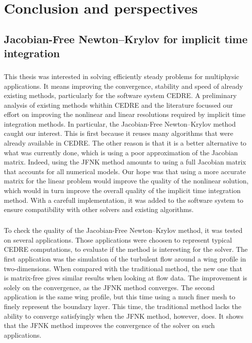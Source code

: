 \chapter*{Conclusion and perspectives}

  \section*{Jacobian-Free Newton--Krylov for implicit time integration}

    \paragraph{}
    This thesis was interested in solving efficiently steady problems for multiphysic applications.
    It means improving the convergence, stability and speed of already existing methods, particularly for the software system CEDRE.
    A preliminary analysis of existing methods whithin CEDRE and the literature focussed our effort on improving the nonlinear and linear resolutions required by implicit time integration methods.
    In particular, the Jacobian-Free Newton--Krylov method caught our interest.
    This is first because it reuses many algorithms that were already available in CEDRE.
    The other reason is that it is a better alternative to what was currently done, which is using a poor approximation of the Jacobian matrix.
    Indeed, using the JFNK method amounts to using a full Jacobian matrix that accounts for all numerical models.
    Our hope was that using a more accurate matrix for the linear problem would improve the quality of the nonlinear solution, which would in turn improve the overall quality of the implicit time integration method.
    With a carefull implementation, it was added to the software system to ensure compatibility with other solvers and existing algorithms.

    \paragraph{}
    To check the quality of the Jacobian-Free Newton--Krylov method, it was tested on several applications.
    Those applications were choosen to represent typical CEDRE computations, to evaluate if the method is interesting for the solver.
    The first application was the simulation of the turbulent flow around a wing profile in two-dimensions.
    When compared with the traditional method, the new one that is matrix-free gives similar results when looking at flow data.
    The improvement is solely on the convergence, as the JFNK method converges.
    The second application is the same wing profile, but this time using a much finer mesh to finely represent the boundary layer.
    This time, the traditional method lacks the ability to converge satisfyingly when the JFNK method, however, does.
    It shows that the JFNK method improves the convergence of the solver on such applications.

